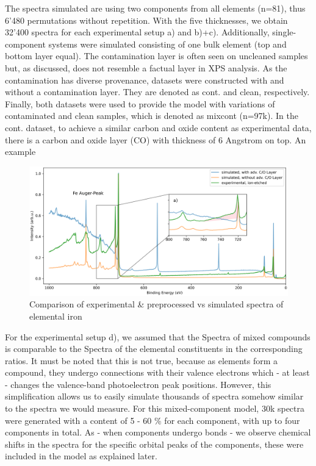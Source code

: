 The spectra simulated are using two components from all elements (n=81), thus 6'480 permutations without repetition. With the five thicknesses, we obtain 32'400 spectra for each experimental setup a) and b)+c). Additionally, single-component systems were simulated consisting of one bulk element (top and bottom layer equal). The contamination layer is often seen on uncleaned samples but, as discussed, does not resemble a factual layer in XPS analysis. As the contamination has diverse provenance, datasets were constructed with and without a contamination layer. They are denoted as cont. and clean, respectively. Finally, both datasets were used to provide the model with variations of contaminated and clean samples, which is denoted as mixcont (n=97k).
In the cont. dataset, to achieve a similar carbon and oxide content as experimental data, there is a carbon and oxide layer (CO) with thickness of 6 Angstrom on top. An example

\begin{figure}[H]
    \includegraphics[width=\textwidth]{Figures/Fe_XPS.png}
    \caption{Comparison of experimental \& preprocessed vs simulated spectra of elemental iron}
    \label{fig:ex_vs_sim}
    \centering
\end{figure}

For the experimental setup d), we assumed that the Spectra of mixed compounds is comparable to the Spectra of the elemental constituents in the corresponding ratios. It must be noted that this is not true, because as elements form a compound, they undergo connections with their valence electrons which - at least - changes the valence-band photoelectron peak positions. However, this simplification allows us to easily simulate thousands of spectra somehow similar to the spectra we would measure. For this mixed-component model, 30k spectra were generated with a content of 5 - 60 \% for each component, with up to four components in total. As - when components undergo bonds - we observe chemical shifts in the spectra for the specific orbital peaks of the components, these were included in the model as explained later.

